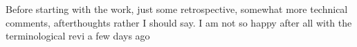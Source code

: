      Before starting with the work,  just some retrospective,  somewhat
more technical comments,  afterthoughts rather I should say.  I am not so
happy after all with the  terminological revi a few days ago

